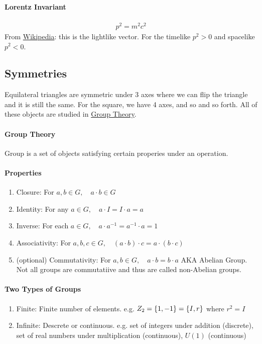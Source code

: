 \documentclass[../main.tex]{subfiles}
\begin{document}
\paragraph{Lorentz Invariant}
\begin{align*}
    p^2 = m^2 c^2
\end{align*}
From \href{https://en.wikipedia.org/wiki/Minkowski_space}{Wikipedia}: this is the lightlike vector.
For the timelike $p^2 > 0$ and spacelike $p^2 < 0$.

\subsection*{Symmetries}

Equilateral triangles are symmetric under 3 axes where we can flip the triangle and it is still the
same. For the square, we have 4 axes, and so and so forth. All of these objects are studied in
\href{https://en.wikipedia.org/wiki/Group_theory}{Group Theory}.

\paragraph{Group Theory} Group is a set of objects satisfying certain properies under an operation.

\paragraph{Properties}
\begin{enumerate}
    \item Closure: For $a, b \in G, \quad a \cdot b \in G$
    \item Identity: For any $a \in G, \quad a \cdot I = I \cdot a = a$
    \item Inverse: For each $a \in G, \quad a \cdot a^{-1} = a^{-1} \cdot a = 1$
    \item Associativity: For $a, b, c \in G, \quad (a \cdot b) \cdot c = a \cdot (b \cdot c)$
    \item (optional) Commutativity: For $a, b \in G, \quad a \cdot b = b \cdot a$ AKA Abelian Group.
    Not all groups are commutatiive and thus are called non-Abelian groups.
\end{enumerate}

\paragraph{Two Types of Groups}
\begin{enumerate}
    \item Finite: Finite number of elements. e.g. $Z_2 = \qt{1, -1} = \qt{I, r}$ where $r^2 = I$
    \item Infinite: Descrete or continuous. e.g. set of integers under addition (discrete), set of
    real numbers under multiplication (continuous), $U(1)$ (continuous)
\end{enumerate}
\end{document}
